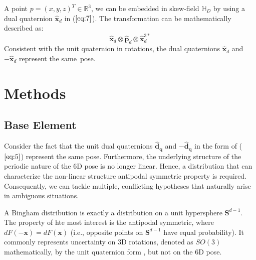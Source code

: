 \documentclass[micromachines,article,accept,pdftex,moreauthors]{Definitions/mdpi}
\begin{document}
A point $p=(x,y,z)^T \in \mathbb{R}^3$, we can be embedded in skew-field $\mathbb{H}_D$ by using a dual quaternion $\widehat{\boldsymbol{x}}_{d}$ in ($\ref{eq:7}$). The transformation can be mathematically described as:
\begin{equation} \label{eq:10}
    \widehat{\boldsymbol{x}}_{d} \otimes
    \widehat{\boldsymbol{p}}_{d} \otimes
    \widehat{\boldsymbol{x}}_{d}^{3*}
\end{equation}
Consistent with the unit quaternion in rotations, the dual quaternions $\widehat{\boldsymbol{x}}_{d}$ and $-\widehat{\boldsymbol{x}}_{d}$ represent the \mbox{same pose.}


\section{Methods} \label{3}

\subsection{Base Element}\label{3.1}
Consider the fact that the unit dual quaternions ${\boldsymbol{\widehat{d}_q}}$ and ${-\boldsymbol{\widehat{d}_q}}$ in the form of ($\ref{eq:5}$) represent the same pose. Furthermore, the underlying structure of the periodic nature of the 6D pose is no longer linear. Hence, a distribution that can characterize the non-linear structure antipodal symmetric property is required. Consequently, we can tackle multiple, conflicting hypotheses that naturally arise in ambiguous situations.

A Bingham distribution \cite{binghamAntipodallySymmetricDistribution1974} is exactly a distribution on a unit hypersphere $\boldsymbol{S}^{d-1}$. The property of hte most interest is the antipodal symmetric, where $dF(-\boldsymbol{x}) = dF(\boldsymbol{x})$ (i.e., opposite points on $\boldsymbol{S}^{d-1}$ have equal probability). It commonly represents uncertainty on 3D rotations, denoted as $SO(3)$ mathematically, by the unit quaternion form \cite{antoneRobustCameraPose2001}, but not on the 6D pose. \\
\end{document}
